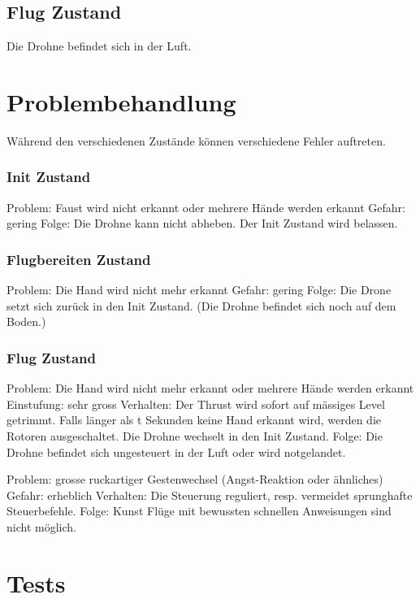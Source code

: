 \subsection{Flug Zustand}
Die Drohne befindet sich in der Luft.



\section{Problembehandlung}
Während den verschiedenen Zustände können verschiedene Fehler auftreten.

\subsubsection{Init Zustand}
Problem:        Faust wird nicht erkannt oder mehrere Hände werden erkannt
Gefahr:        gering
Folge:                Die Drohne kann nicht abheben. Der Init Zustand wird belassen.

\subsubsection{Flugbereiten Zustand}
Problem:        Die Hand wird nicht mehr erkannt
Gefahr:        gering
Folge:                Die Drone setzt sich zurück in den Init Zustand. (Die Drohne befindet sich noch auf dem Boden.)

\subsubsection{Flug Zustand}
Problem:        Die Hand wird nicht mehr erkannt oder mehrere Hände werden erkannt
Einstufung:        sehr gross
Verhalten:        Der Thrust wird sofort auf mässiges Level getrimmt. Falls länger als t Sekunden keine Hand erkannt wird, werden die Rotoren ausgeschaltet. Die Drohne wechselt in den Init Zustand.
Folge:                Die Drohne befindet sich ungesteuert in der Luft oder wird notgelandet.

Problem:        grosse ruckartiger Gestenwechsel (Angst-Reaktion oder ähnliches)
Gefahr:        erheblich
Verhalten:        Die Steuerung reguliert, resp. vermeidet sprunghafte Steuerbefehle.
Folge:                Kunst Flüge mit bewussten schnellen Anweisungen sind nicht möglich.

\section{Tests}


